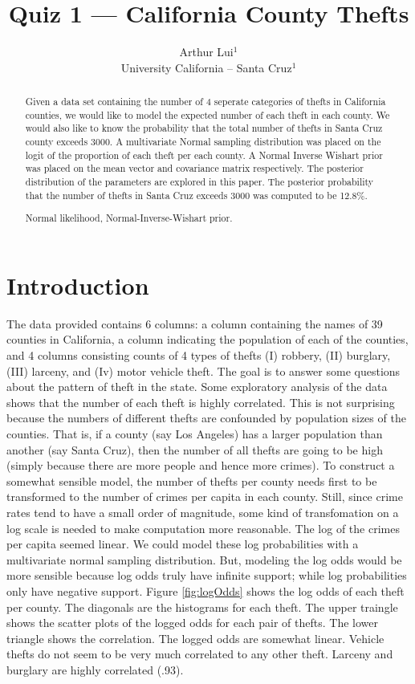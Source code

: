 \documentclass{../../tex_template/asaproc}
\title{Quiz 1 --- California County Thefts}
\author{
  Arthur Lui$^1$\\
  University California -- Santa Cruz$^1$\\
}
\begin{document}
\maketitle


\begin{abstract}
Given a data set containing the number of 4 seperate categories of thefts in
California counties, we would like to model the expected number of each theft
in each county. We would also like to know the probability that the total
number of thefts in Santa Cruz county exceeds 3000. A multivariate Normal
sampling distribution was placed on the logit of the proportion of each theft
per each county. A Normal Inverse Wishart prior was placed on the mean vector
and covariance matrix respectively. The posterior distribution of the parameters
are explored in this paper. The posterior probability that the number of thefts 
in Santa Cruz exceeds 3000 was computed to be 12.8\%.
\begin{keywords}
Normal likelihood, Normal-Inverse-Wishart prior.
\end{keywords}
\end{abstract}


\section{Introduction}
The data provided contains 6 columns: a column containing the names of 39
counties in California, a column indicating the population of each of the
counties, and 4 columns consisting counts of 4 types of thefts (I) robbery,
(II) burglary, (III) larceny, and (Iv) motor vehicle theft. The goal is to
answer some questions about the pattern of theft in the state. Some exploratory
analysis of the data shows that the number of each theft is highly correlated.
This is not surprising because the numbers of different thefts are confounded
by population sizes of the counties. That is, if a county (say Los Angeles) has
a larger population than another (say Santa Cruz), then the number of all
thefts are going to be high (simply because there are more people and hence
more crimes). To construct a somewhat sensible model, the number of thefts per
county needs first to be transformed to the number of crimes per capita in each
county. Still, since crime rates tend to have a small order of magnitude, some
kind of transfomation on a log scale is needed to make computation more
reasonable. The log of the crimes per capita seemed linear. We could model
these log probabilities with a multivariate normal sampling distribution. But,
modeling the log odds would be more sensible because log odds truly have infinite
support; while log probabilities only have negative support. Figure \ref{fig:logOdds}
shows the log odds of each theft per county. The diagonals are the histograms for 
each theft. The upper traingle shows the scatter plots of the logged odds for each 
pair of thefts. The lower triangle shows the correlation. The logged odds
are somewhat linear. Vehicle thefts do not seem to be very much correlated to any
other theft. Larceny and burglary are highly correlated (.93).
\end{document}
